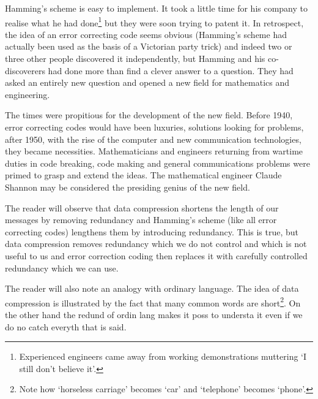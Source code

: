 Hamming's scheme is easy to implement. It
took a little time for his company to
realise what he had done\footnote{Experienced engineers
came away from working demonstrations
muttering `I still don't believe it'.}
but they were soon trying to patent it.
In retrospect, the idea of an error correcting
code seems obvious (Hamming's scheme had
actually been used as the basis of a Victorian
party trick) and indeed two or three other
people discovered it independently, but Hamming
and his
co-discoverers had done more than
find a clever answer to a question. They
had asked an entirely new question and
opened a new field for mathematics and engineering.

The times were propitious for the development
of the new field. Before 1940, error correcting
codes would have been luxuries, solutions
looking for problems, after 1950, with the
rise of the computer and new communication
technologies, they became necessities.
Mathematicians and engineers returning
from wartime duties in
code breaking, code making and
general communications problems were
primed to grasp and extend the ideas.
The mathematical engineer
Claude Shannon may be considered the
presiding  genius of the new field.

The reader will observe that data compression 
shortens the length of our messages by
removing redundancy and Hamming's scheme
(like all error correcting codes) lengthens
them by introducing redundancy. This is true,
but  data compression removes redundancy which we
do not control and which is not useful
to us and error correction coding then
replaces it with carefully controlled
redundancy which we can use.

The reader will also note an analogy with ordinary language.
The idea of data compression is illustrated by the
fact that many common words 
are short\footnote{Note how `horseless carriage'
becomes `car' and `telephone' becomes `phone'.}.
On the other hand the redund of ordin lang
makes it poss to understa it even if we do
no catch everyth that is said.
